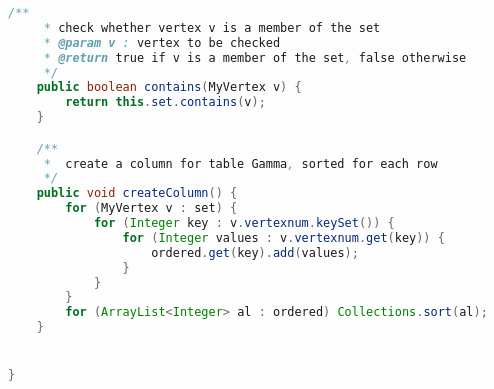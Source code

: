\begin{lstlisting}[language=Java,basicstyle=\tiny,caption=MyFurSet.java]
    /**
     * check whether vertex v is a member of the set
     * @param v : vertex to be checked
     * @return true if v is a member of the set, false otherwise
     */
    public boolean contains(MyVertex v) {
        return this.set.contains(v);
    }

    /**
     *  create a column for table Gamma, sorted for each row
     */
    public void createColumn() {
        for (MyVertex v : set) {
            for (Integer key : v.vertexnum.keySet()) {
                for (Integer values : v.vertexnum.get(key)) {
                    ordered.get(key).add(values);
                }
            }
        }
        for (ArrayList<Integer> al : ordered) Collections.sort(al);
    }


}
\end{lstlisting}